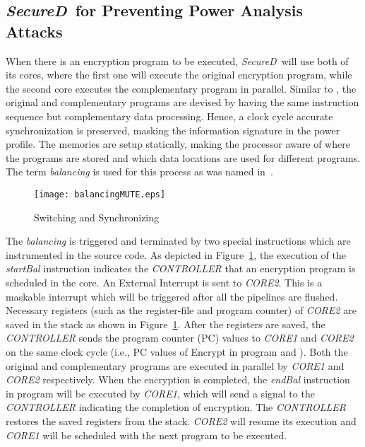 \documentclass{article}
\newcommand{\SecureD}{\emph{SecureD}}
\begin{document}
\subsection{\SecureD\ for Preventing Power Analysis Attacks} \label{mute-arch}
When there is an encryption program to be executed, \SecureD\ will use
both of its cores, where the first one will execute      the original
encryption program, while the second core executes  the complementary
program in parallel. Similar to \cite{ambrose2011multiprocessor}, the original
and complementary programs are devised by having the same instruction
sequence  but  complementary  data   processing. Hence, a clock cycle
accurate  synchronization   is     preserved, masking the information
signature in the power profile. The  memories  are  setup statically,
making the processor aware of where the programs are stored and which
data  locations  are  used  for  different  programs. The term
\emph{balancing} is used for this process as was named 
in~\cite{ambrose2011multiprocessor}.

\begin{figure}[ht!]
\centering
\texttt{[image: balancingMUTE.eps]}
\caption{Switching and Synchronizing}
\label{balancing}
\end{figure}

The \emph{balancing}  is  triggered     and terminated by two special
instructions which are instrumented in the   source code. As depicted
in             Figure~\ref{balancing},      the  execution  of    the
\emph{startBal}   instruction indicates the \emph{CONTROLLER} that an
encryption program is scheduled in the core. An External Interrupt is 
sent   to      \emph{CORE2}. This is a maskable interrupt which will be
triggered after all the pipelines are flushed. Necessary      registers
(such as the register-file and program counter) of \emph{CORE2}  are saved
in  the  stack     as shown in Figure~\ref{balancing}.  After     the
registers are saved, the \emph{CONTROLLER} sends  the program counter
(PC) values to \emph{CORE1} and \emph{CORE2} on the same clock  cycle
(i.e., PC values of Encrypt in program  and ).  Both
the original   and complementary programs are executed in parallel by
\emph{CORE1} and \emph{CORE2} respectively. When  the   encryption is
completed, the  \emph{endBal}      instruction in program  will be
executed by \emph{CORE1}, which             will send a signal to the
\emph{CONTROLLER} indicating        the completion of encryption. The
\emph{CONTROLLER}        restores the saved registers from the stack.
\emph{CORE2}  will  resume  its execution and \emph{CORE1}    will be
scheduled with the next program to be executed.
\end{document}
